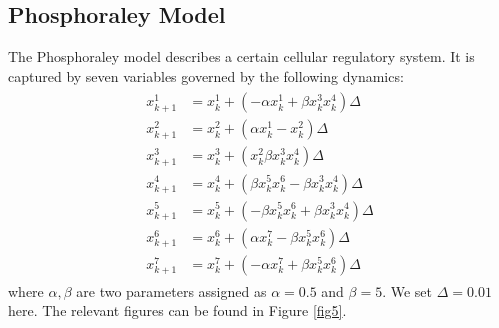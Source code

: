 \documentclass[EPiC]{easychair}
\begin{document}
\subsection{Phosphoraley Model}
The Phosphoraley model describes a certain cellular regulatory system. It is captured by seven variables governed by the following dynamics:
\begin{align}
    \begin{split}
        x^1_{k+1} &= x^1_k + ( -\alpha x^1_k + \beta x^3_k x^4_k)\Delta \\
        x^2_{k+1} &= x^2_k + (  \alpha x^1_k - x^2_k)\Delta \\
        x^3_{k+1} &= x^3_k + ( x^2_k \beta x^3_k x^4_k)\Delta \\
        x^4_{k+1} &= x^4_k + ( \beta x^5_k x^6_k - \beta x^3_k x^4_k)\Delta \\
        x^5_{k+1} &= x^5_k + ( -\beta x^5_k x^6_k + \beta x^3_k x^4_k)\Delta \\
        x^6_{k+1} &= x^6_k + ( \alpha x^7_k - \beta x^5_k x^6_k)\Delta \\
        x^7_{k+1} &= x^7_k + ( -\alpha x^7_k + \beta x^5_k x^6_k)\Delta
    \end{split}
\end{align}
where $\alpha,\beta$ are two parameters assigned as $\alpha=0.5$ and $\beta=5$. We set $\Delta =0.01$ here. The relevant figures can be found in Figure \ref{fig5}.
\end{document}
